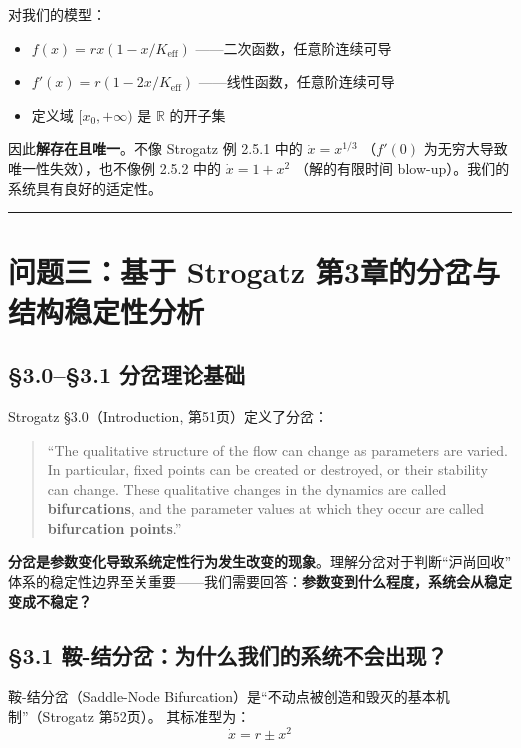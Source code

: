 \documentclass[12pt,a4paper]{article}
\begin{document}
对我们的模型：
\begin{itemize}
  \item $f(x) = r x(1 - x/K_{\text{eff}})$ ——二次函数，任意阶连续可导
  \item $f'(x) = r(1 - 2x/K_{\text{eff}})$ ——线性函数，任意阶连续可导
  \item 定义域 $[x_0, +\infty)$ 是 $\mathbb{R}$ 的开子集
\end{itemize}

因此\textbf{解存在且唯一}。不像 Strogatz 例 2.5.1 中的 $\dot{x} = x^{1/3}$
（$f'(0)$ 为无穷大导致唯一性失效），也不像例 2.5.2 中的 $\dot{x} = 1 + x^2$
（解的有限时间 blow-up）。我们的系统具有良好的适定性。

\vspace{12pt}
\hrule
\vspace{12pt}

\section{问题三：基于 Strogatz 第3章的分岔与结构稳定性分析}

\subsection{\S3.0--\S3.1 分岔理论基础}

Strogatz \S3.0（Introduction, 第51页）定义了分岔：

\begin{quote}
\small
``The qualitative structure of the flow can change as parameters are varied. In particular,
fixed points can be created or destroyed, or their stability can change. These qualitative
changes in the dynamics are called \textbf{bifurcations}, and the parameter values at which
they occur are called \textbf{bifurcation points}.''
\end{quote}

\textbf{分岔是参数变化导致系统定性行为发生改变的现象}。理解分岔对于判断``沪尚回收''
体系的稳定性边界至关重要——我们需要回答：\textbf{参数变到什么程度，系统会从稳定变成不稳定？}

\subsection{\S3.1 鞍-结分岔：为什么我们的系统不会出现？}

鞍-结分岔（Saddle-Node Bifurcation）是``不动点被创造和毁灭的基本机制''（Strogatz 第52页）。
其标准型为：
\begin{equation}
\dot{x} = r \pm x^2
\end{equation}
\end{document}
